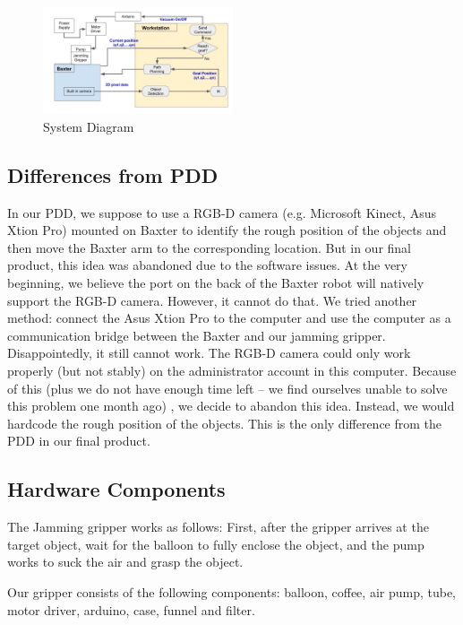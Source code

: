 \documentclass[conference,a4paper]{IEEEtran}
\begin{document}
\begin{figure}[h]
\centering
\includegraphics[width=0.5\textwidth]{System_Diagram.jpg}
\caption{System Diagram}
\label{fig:System Diagram}
\end{figure}

\subsection{Differences from PDD}

In our PDD, we suppose to use a RGB-D camera (e.g. Microsoft Kinect, Asus Xtion Pro) mounted on Baxter to identify the rough position of the objects and then move the Baxter arm to the corresponding location. But in our final product, this idea was abandoned due to the software issues. At the very beginning, we believe the port on the back of the Baxter robot will natively support the RGB-D camera. However, it cannot do that. We tried another method: connect the Asus Xtion Pro to the computer and use the computer as a communication bridge between the Baxter and our jamming gripper. Disappointedly, it still cannot work. The RGB-D camera could only work properly (but not stably) on the administrator account in this computer. Because of this (plus we do not have enough time left -- we find ourselves unable to solve this problem one month ago) , we decide to abandon this idea. Instead, we would hardcode the rough position of the objects. This is the only difference from the PDD in our final product. 

\subsection{Hardware Components}

The Jamming gripper works as follows: First, after the gripper arrives at the target object, wait for the balloon to fully enclose the object, and the pump works to suck the air and grasp the object. 
	
Our gripper consists of the following components: balloon, coffee, air pump, tube, motor driver, arduino, case, funnel and filter.
\end{document}
